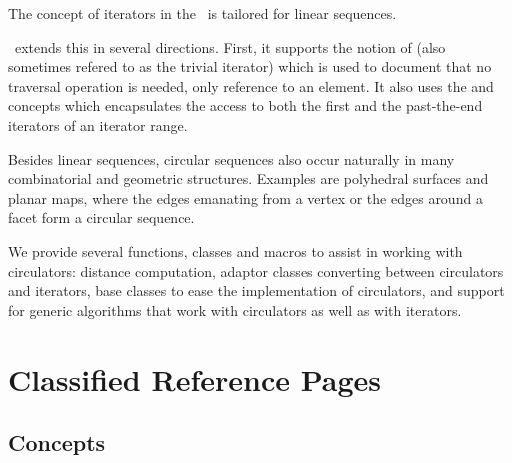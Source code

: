 

The concept of iterators in the \stl\ is tailored for linear sequences.

\cgal\ extends this in several directions.  First, it supports the notion
of  (also sometimes refered to as the trivial iterator) which is
used to document that no traversal operation is needed, only reference to an
element.  It also uses the  and  concepts which
encapsulates the access to both the first and the past-the-end iterators of an
iterator range.

Besides linear sequences, circular sequences also occur naturally in many combinatorial
and geometric structures. Examples are polyhedral surfaces and planar
maps, where the edges emanating from a vertex or the edges around a
facet form a circular sequence. 

We provide several functions, classes and macros to assist in working
with circulators: distance computation, adaptor classes converting
between circulators and iterators, base classes to ease the implementation
of circulators, and support for generic algorithms that work with
circulators as well as with iterators.

\section{Classified Reference Pages}

\subsection*{Concepts}

\\
\\
\\
\\
\\
\\
\\

